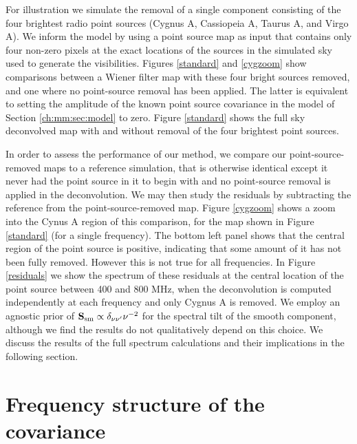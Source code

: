 For illustration we simulate the removal of a single component consisting of the four brightest radio point sources (Cygnus A, Cassiopeia A, Taurus A, and Virgo A). We inform the model by using a point source map as input that contains only four non-zero pixels at the exact locations of the sources in the simulated sky used to generate the visibilities. Figures \ref{standard} and \ref{cygzoom} show comparisons between a Wiener filter map with these four bright sources removed, and one where no point-source removal has been applied. The latter is equivalent to setting the amplitude of the known point source covariance in the model of Section \ref{ch:mm:sec:model} to zero. Figure \ref{standard} shows the full sky deconvolved map with and without removal of the four brightest point sources. 

In order to assess the performance of our method, we compare our point-source-removed maps to a reference simulation, that is otherwise identical except it never had the point source in it to begin with and no point-source removal is applied in the deconvolution. We may then study the residuals by subtracting the reference from the point-source-removed map. Figure \ref{cygzoom} shows a zoom into the Cynus A region of this comparison, for the map shown in Figure \ref{standard} (for a single frequency). The bottom left panel shows that the central region of the point source is positive, indicating that some amount of it has not been fully removed. However this is not true for all frequencies. In Figure \ref{residuals} we show the spectrum of these residuals at the central location of the point source between 400 and 800 MHz, when the deconvolution is computed independently at each frequency and only Cygnus A is removed. We employ an agnostic prior of $\mathbf{S}_{\rm sm} \propto \delta_{\nu\nu'}\nu^{-2}$ for the spectral tilt of the smooth component, although we find the results do not qualitatively depend on this choice. We discuss the results of the full spectrum calculations and their implications in the following section.


\section{Frequency structure of the covariance}
\label{ch:mm:sec:freq}

